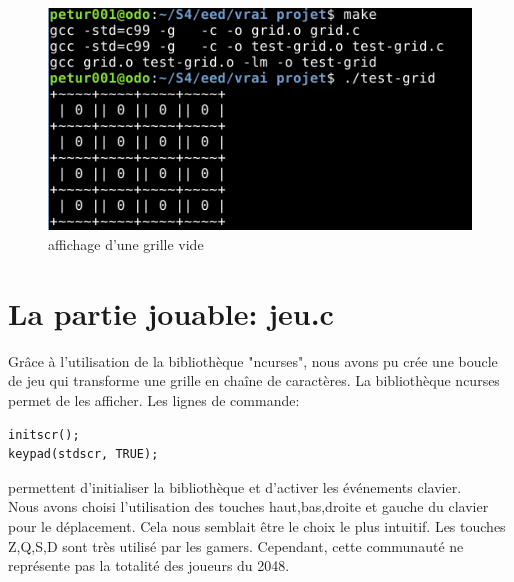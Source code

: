 \documentclass{report}
\begin{document}
\begin{figure}[hbtp]
\caption{affichage d'une grille vide}
\centering
\includegraphics[scale=0.6]{1ergrille.png}
\end{figure}
\section{La partie jouable: jeu.c}
Grâce à l'utilisation de la bibliothèque "ncurses", nous avons pu crée une boucle de jeu qui transforme une grille en chaîne de caractères. La bibliothèque ncurses permet de les afficher. Les lignes de commande:
\begin{lstlisting}[frame=single]
initscr(); 
keypad(stdscr, TRUE);
\end{lstlisting}
permettent d'initialiser la bibliothèque et d'activer les événements clavier.\\
Nous avons choisi l'utilisation des touches haut,bas,droite et gauche du clavier pour le déplacement. Cela nous semblait être le choix le plus intuitif. Les touches Z,Q,S,D sont très utilisé par les gamers. Cependant, cette communauté ne représente pas la totalité des joueurs du 2048.
\end{document}
